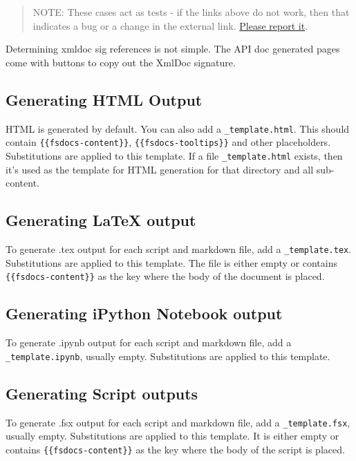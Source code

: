 \documentclass{article}
\begin{document}
\begin{quote}


NOTE: These cases act as tests - if the links above do not work, then that indicates a bug or a change in the
external link. \href{https://github.com/fsprojects/FSharp.Formatting/issues/new}{Please report it}.
\end{quote}



Determining xmldoc sig references is not simple.  The API doc generated pages come with
buttons to copy out the XmlDoc signature.
\subsection*{Generating HTML Output}



HTML is generated by default. You can also add a \texttt{\_template.html}.  This should contain \texttt{\{\{fsdocs-content\}\}},  \texttt{\{\{fsdocs-tooltips\}\}}
and other placeholders. Substitutions are
applied to this template.
If a file \texttt{\_template.html} exists, then it's used as the template for HTML generation for that directory and all sub-content.
\subsection*{Generating LaTeX output}



To generate .tex output for each script and markdown file, add a \texttt{\_template.tex}. Substitutions are
applied to this template. The file is either empty or contains \texttt{\{\{fsdocs-content\}\}} as the key where the body
of the document is placed.
\subsection*{Generating iPython Notebook output}



To generate .ipynb output for each script and markdown file, add a \texttt{\_template.ipynb}, usually empty. Substitutions are
applied to this template.
\subsection*{Generating Script outputs}



To generate .fsx output for each script and markdown file, add a \texttt{\_template.fsx}, usually empty. Substitutions are
applied to this template. It is either empty or contains \texttt{\{\{fsdocs-content\}\}} as the key where the body
of the script is placed.
\end{document}
